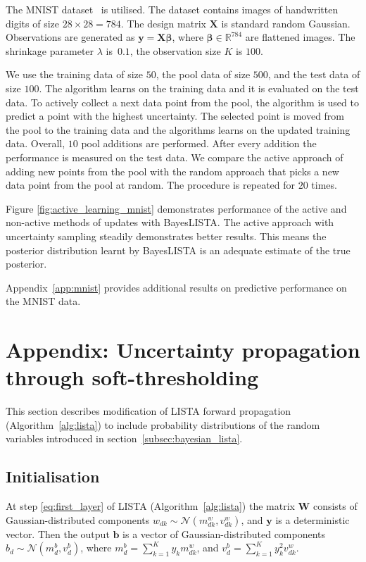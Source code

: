 \documentclass{article}
\begin{document}
 The MNIST dataset~\cite{lecun1998gradient} is utilised. The dataset contains images of handwritten digits of size $28 \times 28 = 784$. The design matrix $\mathbf{X}$ is standard random Gaussian. Observations are generated as $\mathbf{y} = \mathbf{X}\boldsymbol\beta$, where $\boldsymbol\beta \in \mathbb{R}^{784}$ are flattened images. The shrinkage parameter $\lambda$ is~$0.1$, the observation size $K$ is $100$.

 We use the training data of size $50$, the pool data of size $500$,  and the test data of size $100$. The algorithm learns on the training data and it is evaluated on the test data. To actively collect a next data point from the pool, the algorithm is used to predict a point with the highest uncertainty. The selected point is moved from the pool to the training data and the algorithms learns on the updated training data. Overall, $10$ pool additions are performed. After every addition the performance is measured on the test data. We compare the active approach of adding new points from the pool with the random approach that picks a new data point from the pool at random. The procedure is repeated for $20$ times.
  
  Figure \ref{fig:active_learning_mnist} demonstrates performance of the active and non-active methods of updates with BayesLISTA. The active approach with uncertainty sampling steadily demonstrates better results. This means the posterior distribution learnt by BayesLISTA is an adequate estimate of the true posterior.
  
 Appendix~\ref{app:mnist} provides additional results on predictive performance on the MNIST data.
 

{\small


}

\appendix
  \section{Appendix: Uncertainty propagation through soft-thresholding}
  \label{sec:fprop}
  This section describes modification of LISTA forward propagation (Algorithm~\ref{alg:lista}) to include probability distributions of the random variables introduced in section~\ref{subsec:bayesian_lista}. 
  
  \subsection*{Initialisation}
  \label{subsec:forward_init}
  At step \ref{eq:first_layer} of LISTA (Algorithm~\ref{alg:lista}) the matrix $\mathbf{W}$ consists of Gaussian-distributed components $w_{dk} \sim \mathcal{N}(m^w_{dk}, v^w_{dk})$, and $\mathbf{y}$ is a deterministic vector. Then the output $\mathbf{b}$ is a vector of Gaussian-distributed components $b_d \sim \mathcal{N}(m^b_d, v^b_d)$, where $m^b_d = \sum_{k=1}^Ky_k m^w_{dk}$, and $v^b_d = \sum_{k=1}^Ky_k^2v^w_{dk}$.
  
\end{document}
